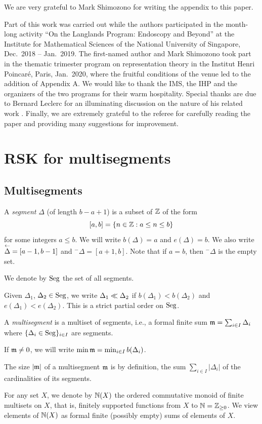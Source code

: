 \documentclass{ert-l} %
\begin{document}
We are very grateful to Mark Shimozono for writing the appendix to this paper.

Part of this work was carried out while the authors participated in the month-long activity
``On the Langlands Program: Endoscopy and Beyond'' at
the Institute for Mathematical Sciences of the National University of Singapore,
Dec.~2018 -- Jan.~2019. The first-named author and Mark Shimozono took part in the thematic trimester program on representation theory in the Institut Henri Poincar\'{e}, Paris, Jan.~2020,
where the fruitful conditions of the venue led to the addition of Appendix A. We would like to thank the IMS, the IHP and the organizers of the two programs
for their warm hospitality. Special thanks are due to Bernard Leclerc for an illuminating discussion on the nature of his related work \cite{MR1392496}.
Finally, we are extremely grateful to the referee for carefully reading the paper and providing many suggestions for improvement.

\section{RSK for multisegments}
\subsection{Multisegments}
A \emph{segment} $\Delta$ (of length $b-a+1$) is a subset of $\mathbb{Z}$ of the form
\[
[a,b]=\{n\in\mathbb{Z}:a\le n\le b\}
\]
for some integers $a\le b$.
We will write $b(\Delta)=a$ and $e(\Delta)=b$.
We also write $\lshft\Delta=[a-1,b-1]$ and ${}^-\Delta=[a+1,b]$. Note that if $a=b$, then ${}^-\Delta$ is the empty set.

We denote by $\operatorname{Seg}$ the set of all segments.

Given $\Delta_1$, $\Delta_2\in\operatorname{Seg}$, we write $\Delta_1\ll\Delta_2$ if $b(\Delta_1)<b(\Delta_2)$
and $e(\Delta_1)<e(\Delta_2)$. This is a strict partial order on $\operatorname{Seg}$.

A \emph{multisegment} is a multiset of segments, i.e., a formal finite sum
$\mathfrak{m}=\sum_{i\in I}\Delta_i$ where $\{\Delta_i\in \operatorname{Seg}\}_{i\in I}$ are segments.

If $\mathfrak{m}\ne0$, we will write $\min\mathfrak{m}=\min_{i\in I}b(\Delta_i)$.

The size $|\mathfrak{m}|$ of a multisegment $\mathfrak{m}$ is by definition, the sum $\sum_{i\in I} |\Delta_i|$ of the cardinalities of its segments.


For any set $X$, we denote by $\mathbb{N}(X)$ the ordered commutative monoid of finite multisets on $X$,
that is, finitely supported functions from $X$ to $\mathbb{N}=\mathbb{Z}_{\ge0}$. We view elements of $\mathbb{N}(X)$ as formal finite (possibly empty) sums
of elements of $X$.
\end{document}
